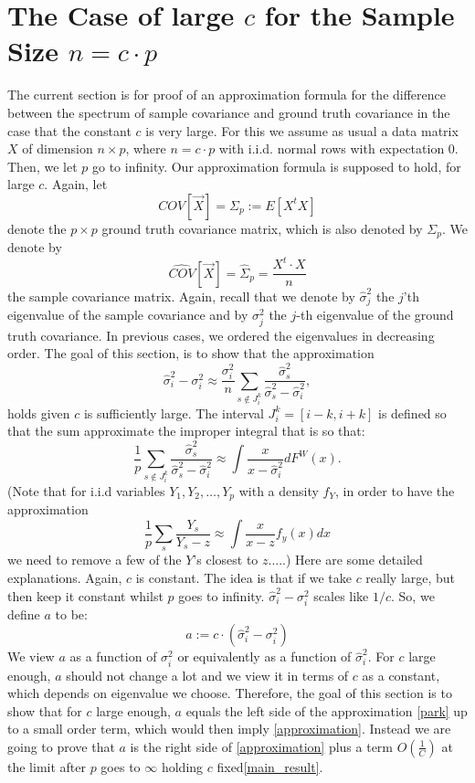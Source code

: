 \documentclass[12pt]{amsart}
\theoremstyle{definition}
\numberwithin{equation}{section}
\numberwithin{equation}{section}
\theoremstyle{remark}
\numberwithin{equation}{section}
\begin{document}
\section{The Case of large $c$ for the Sample Size $n = c\cdot p$}
\label{section_large_constant}
The current section is for proof of an approximation formula
for the difference between the spectrum of sample covariance and
 ground truth covariance in the case that the constant $c$
is very large. For this we assume as usual a data matrix
$X$ of dimension $n\times p$, where $n=c\cdot p$ with i.i.d.
normal rows with expectation $0$. Then,
we let $p$ go to infinity. Our approximation formula
is supposed to hold, for large $c$. Again,
let
$$COV[\vec{X}]=\Sigma_p:=E[X^tX]$$ denote the $p\times p$ ground truth covariance matrix, which is also denoted by $\Sigma_p$. We denote by $$\hat{COV}[\vec{X}]=\hat{\Sigma}_p=\frac{X^t\cdot X}{n}$$ the sample covariance matrix.
Again, recall that we denote by $\hat{\sigma}_j^2$ the $j$'th eigenvalue of the sample covariance and by $\sigma_j^2$ the $j$-th eigenvalue of the ground truth covariance. In previous cases, we ordered the eigenvalues in decreasing order. The goal of this section, is to show that the approximation
\begin{equation}
\label{approximation}
\hat{\sigma}_i^2-\sigma^2_i\approx  \frac{\sigma^2_i}{n}\sum_{s\notin J^k_i}\frac{\hat{\sigma}^2_s}{\hat{\sigma}^2_s-\hat{\sigma}^2_i},
\end{equation}
holds given $c$ is sufficiently large. The interval $J^k_i=[i-k,i+k]$ is defined so that the sum
approximate the improper integral that is so that:
\begin{equation}
\label{park}
\frac{1}{p}\sum_{s\notin J^k_i}\frac{\hat{\sigma}^2_s}{\hat{\sigma}^2_s-\hat{\sigma}^2_i}\approx \int \frac{x}{x-\hat{\sigma}_i^2}dF^W(x).
\end{equation}
(Note that for i.i.d variables $Y_1,Y_2,\ldots,Y_p$ with a density $f_Y$, in order to have the approximation
$$\frac{1}{p}\sum_s \frac{Y_s}{Y_s-z}\approx \int  \frac{x}{x-z} f_y(x)dx$$
we need to remove a few of the $Y$'s closest to $z$.....)
Here are some detailed explanations. Again, $c$ is constant. The idea is that if we take $c$ really large, but then keep it constant whilst $p$ goes to infinity. $\hat{\sigma}_i^2-\sigma^2_i$ scales like $1/c$.
So, we define $a$ to be:
$$a:=c\cdot (\hat{\sigma}^2_i-\sigma_i^2)$$
We view $a$ as a function of $\sigma^2_i$ or equivalently as a function
of $\hat{\sigma}^2_i$. For $c$ large enough, $a$ should not change a lot and we view it in terms
of $c$ as a constant, which depends on eigenvalue we choose.
Therefore, the goal of this section is to show that for $c$ large enough, $a$ equals the left side of the approximation \ref{park}
up to a small order term,
which would then imply \ref{approximation}.
Instead we are going to prove that $a$ is the right side of \ref{approximation} plus a term $O(\frac{1}{C})$ at the limit after
$p$ goes to $\infty$ holding $c$ fixed\ref{main_result}.
\end{document}
